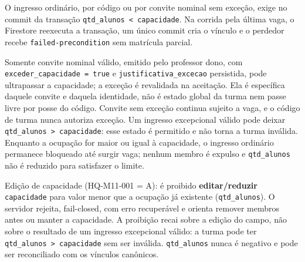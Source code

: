 \begin{regra}
O ingresso ordinário, por código ou por convite nominal sem exceção, exige no
commit da transação \texttt{qtd\_alunos < capacidade}. Na corrida pela última
vaga, o Firestore reexecuta a transação, um único commit cria o vínculo e o
perdedor recebe \texttt{failed-precondition} sem matrícula parcial.

Somente convite nominal válido, emitido pelo professor dono, com
\texttt{exceder\_capacidade = true} e \texttt{justificativa\_excecao}
persistida, pode ultrapassar a capacidade; a exceção é revalidada na aceitação.
Ela é específica daquele convite e daquela identidade, não é estado global da
turma nem passe livre por posse do código. Convite sem exceção continua sujeito
a vaga, e o código de turma nunca autoriza exceção. Um ingresso excepcional
válido pode deixar \texttt{qtd\_alunos > capacidade}: esse estado é permitido e
não torna a turma inválida. Enquanto a ocupação for maior ou igual à capacidade,
o ingresso ordinário permanece bloqueado até surgir vaga; nenhum membro é
expulso e \texttt{qtd\_alunos} não é reduzido para satisfazer o limite.

Edição de capacidade (HQ-M11-001 = A): é proibido \textbf{editar/reduzir}
\texttt{capacidade} para valor menor que a ocupação já existente
(\texttt{qtd\_alunos}). O servidor rejeita, fail-closed, com erro recuperável e
orienta remover membros antes ou manter a capacidade. A proibição recai sobre a
edição do campo, não sobre o resultado de um ingresso excepcional válido: a
turma pode ter \texttt{qtd\_alunos > capacidade} sem ser inválida.
\texttt{qtd\_alunos} nunca é negativo e pode ser reconciliado com os vínculos
canônicos.
\end{regra}

